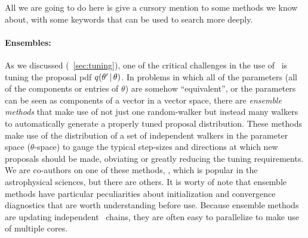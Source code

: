 \documentclass[modern]{aastex61}
\newcommand{\MCMC}{\acronym{MCMC}}
\newcommand{\pars}{\theta}
\begin{document}
All we are going to do here is give a cursory mention to some methods
we know about, with some keywords that can be used to search more
deeply.

%
%


\paragraph{Ensembles:}
As we discussed (\sectionname~\ref{sec:tuning}), one of the critical challenges in the use of
\MCMC\ is tuning the proposal pdf $q(\pars'\given\pars)$.
In problems in which all of the parameters (all of the components or entries of $\pars$) are somehow ``equivalent'',
or the parameters can be seen as components of a vector in a vector
space, there are \emph{ensemble methods} that make use of not just one
random-walker but instead many walkers to automatically generate a properly tuned
proposal distribution.
These methods make use of the distribution of a set of independent
walkers in the parameter space ($\pars$-space) to gauge the typical step-sizes and
directions at which new proposals should be made, obviating or greatly
reducing the tuning requirements.
We are co-authors on one of these methods,
, which is popular in the
astrophysical sciences, but there are others.
It is worty of note that ensemble methods have particular
peculiarities about initialization and convergence diagnostics that
are worth understanding before use.
Because ensemble methods are updating independent \MCMC\ chains, they
are often easy to parallelize to make use of multiple cores.
\end{document}
